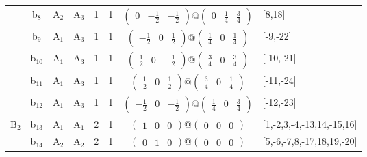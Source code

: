 \documentclass[fleqn,10pt,landscape]{article}
\begin{document}
\begin{itemize}
\begin{center}
\begin{longtable}{cc|cc|c|c|c|l}
& b$_{8}$ & A$_{2}$ & A$_{3}$ & 1 & 1 & $\begin{pmatrix} 0 & - \frac{1}{2} & - \frac{1}{2} \end{pmatrix}@\begin{pmatrix} 0 & \frac{1}{4} & \frac{3}{4} \end{pmatrix}$ & [8,18] \\
& b$_{9}$ & A$_{1}$ & A$_{3}$ & 1 & 1 & $\begin{pmatrix} - \frac{1}{2} & 0 & \frac{1}{2} \end{pmatrix}@\begin{pmatrix} \frac{1}{4} & 0 & \frac{1}{4} \end{pmatrix}$ & [-9,-22] \\
& b$_{10}$ & A$_{1}$ & A$_{3}$ & 1 & 1 & $\begin{pmatrix} \frac{1}{2} & 0 & - \frac{1}{2} \end{pmatrix}@\begin{pmatrix} \frac{3}{4} & 0 & \frac{3}{4} \end{pmatrix}$ & [-10,-21] \\
& b$_{11}$ & A$_{1}$ & A$_{3}$ & 1 & 1 & $\begin{pmatrix} \frac{1}{2} & 0 & \frac{1}{2} \end{pmatrix}@\begin{pmatrix} \frac{3}{4} & 0 & \frac{1}{4} \end{pmatrix}$ & [-11,-24] \\
& b$_{12}$ & A$_{1}$ & A$_{3}$ & 1 & 1 & $\begin{pmatrix} - \frac{1}{2} & 0 & - \frac{1}{2} \end{pmatrix}@\begin{pmatrix} \frac{1}{4} & 0 & \frac{3}{4} \end{pmatrix}$ & [-12,-23] \\ \hline
B$_{2}$ & b$_{13}$ & A$_{1}$ & A$_{1}$ & 2 & 1 & $\begin{pmatrix} 1 & 0 & 0 \end{pmatrix}@\begin{pmatrix} 0 & 0 & 0 \end{pmatrix}$ & [1,-2,3,-4,-13,14,-15,16] \\
& b$_{14}$ & A$_{2}$ & A$_{2}$ & 2 & 1 & $\begin{pmatrix} 0 & 1 & 0 \end{pmatrix}@\begin{pmatrix} 0 & 0 & 0 \end{pmatrix}$ & [5,-6,-7,8,-17,18,19,-20] \\

\end{longtable}
\end{center}
\end{itemize}
\end{document}

